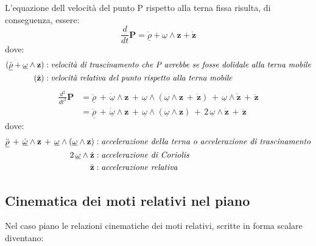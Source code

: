 			L'equazione dell velocità del punto P rispetto alla terna fissa risulta, di conseguenza, essere:
			\[
				\frac{d}{dt}\mathbf{P} = \dot{\underline{\rho}} + \underline{\omega}\wedge\mathbf{z} + \dot{\mathbf{z}}
			\]
			dove: 
			\begin{align*}
				( \dot{\underline{\rho}} + \underline{\omega}\wedge\mathbf{z}) &: \emph{velocità di trascinamento che P avrebbe se fosse dolidale alla terna mobile}\\
				( \dot{\mathbf{z}})&: \emph{velocità relativa del punto rispetto alla terna mobile}
			\end{align*}
			\[
			\begin{split}
				\frac{d^2}{dt^2}\mathbf{P} &= \ddot{\underline{\rho}} \, +\, \dot{\underline{\omega}} \wedge\mathbf{z} \,+\, \underline{\omega}\wedge(\underline{\omega}\wedge\mathbf{z}\,+\,\dot{\mathbf{z}})\, +\, \underline{\omega}\wedge\dot{\mathbf{z}}\, +\,\ddot{\mathbf{z}}\\
				&= \ddot{\underline{\rho}}\,+\,\dot{\underline{\omega}}\wedge\mathbf{z}\,+\, \underline{\omega}\wedge(\underline{\omega}\wedge\mathbf{z}) \,+\,2\,\underline{\omega}\wedge\dot{\mathbf{z}} \,+\, \ddot{\mathbf{z}} 
			\end{split}
			\]
			dove:
			\begin{align*}
				 \ddot{\underline{\rho}}\,+\,\dot{\underline{\omega}}\wedge\mathbf{z}\,+\, \underline{\omega}\wedge(\underline{\omega}\wedge\mathbf{z}) &: \emph{accelerazione della terna o accelerazione di trascinamento}\\
				2\,\underline{\omega}\wedge\dot{\mathbf{z}}&: \emph{accelerazione di Coriolis}\\
				\ddot{\mathbf{z}}  &: \emph{accelerazione relativa}
			\end{align*}
			
			\subsection{Cinematica dei moti relativi nel piano}
		
		Nel caso piano le relazioni cinematiche dei moti relativi, scritte in forma scalare diventano:
		
